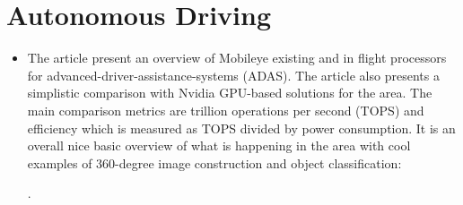 \section*{Autonomous Driving}
\begin{itemize}
    \item The article present an overview of Mobileye existing and in flight processors for advanced-driver-assistance-systems (ADAS). The article also presents a simplistic comparison with Nvidia GPU-based solutions for the area. The main comparison metrics are trillion operations per second (TOPS) and efficiency which is measured as TOPS divided by power consumption. It is an overall nice basic overview of what is happening in the area with cool examples of 360-degree image construction and object classification:

    \cite{Delmer:Mobileye:2019}.
\end{itemize}


